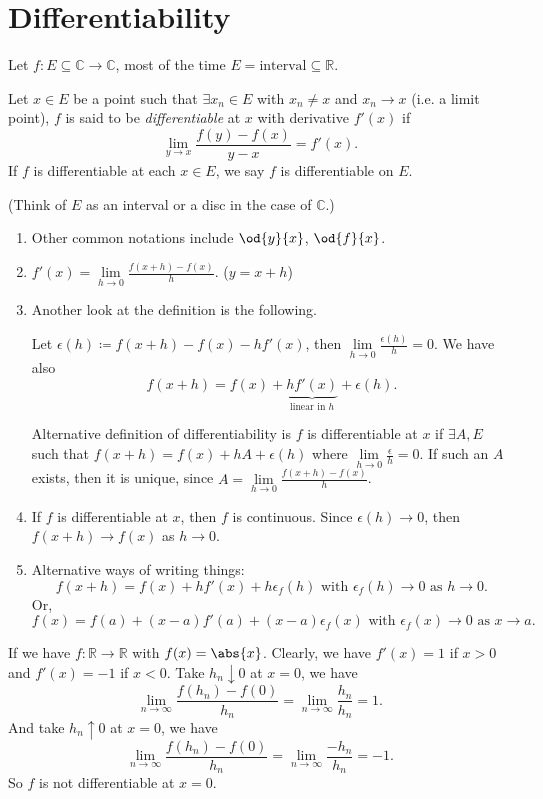 \section{Differentiability}
Let \(f: E \subseteq \mathbb{C} \to \mathbb{C}\), most of the time \(E = \text{interval} \subseteq \mathbb{R}\).
\begin{definition}{}{}
    Let \(x \in E\) be a point such that \(\exists x_n \in E\) with \(x_n \neq x\) and \(x_n \to x\) (i.e. a limit point), \(f\) is said to be \textit{differentiable}  at \(x\) with derivative \(f'(x)\) if
    \[
        \lim\limits_{y \to x} \frac{f(y) - f(x)}{y - x} = f'(x).
    \]
    If \(f\) is differentiable at each \(x \in E\), we say \(f\) is differentiable on \(E\).

    (Think of \(E\) as an interval or a disc in the case of \(\mathbb{C}\).)
\end{definition}
\begin{remark}
    \leavevmode
    \begin{enumerate}
        \item Other common notations include \(\od{y}{x}\), \(\od{f}{x}\).
        \item \(f'(x) = \lim\limits_{h \to 0} \frac{f(x+h)-f(x)}{h}\). (\(y=x+h\))
        \item Another look at the definition is the following.
        
        Let \(\epsilon(h) \coloneqq f(x + h) - f(x) - hf'(x)\), then \(\lim\limits_{h \to 0} \frac{\epsilon(h)}{h}=0\). We have also
        \[
            f(x+h) = f(x) + \underbrace{hf'(x)}_{\text{linear in }h} + \epsilon(h).
        \]

        Alternative definition of differentiability is \(f\) is differentiable at \(x\) if \(\exists A, E\) such that \(f(x + h) = f(x) + hA + \epsilon(h)\) where \(\lim\limits_{h \to 0} \frac{\epsilon}{h}=0\). If such an \(A\) exists, then it is unique, since \(A = \lim\limits_{h \to 0} \frac{f(x+h) - f(x)}{h}\).
        \item If \(f\) is differentiable at \(x\), then \(f\) is continuous. Since \(\epsilon(h) \to 0\), then \(f(x + h) \to f(x)\) as \(h \to 0\).
        \item Alternative ways of writing things:
        \[
            f(x + h) = f(x) + hf'(x) + h\epsilon_f(h) \text{ with } \epsilon_f(h) \to 0 \text{ as } h\to 0.
        \]
        Or,
        \[
            f(x) = f(a) + (x-a)f'(a) + (x-a)\epsilon_f(x) \text{ with } \epsilon_f(x) \to 0 \text{ as } x\to a.
        \]
    \end{enumerate}
\end{remark}
\begin{example}
    If we have \(f: \mathbb{R}\to \mathbb{R}\) with \(f(x) = \abs{x} \). Clearly, we have
    \(f'(x) = 1\) if \(x > 0\) and \(f'(x) = -1\) if \(x < 0\). Take \(h_n \downarrow 0\) at \(x = 0\), we have
    \[
        \lim\limits_{n \to \infty} \frac{f(h_n) - f(0)}{h_n} = \lim\limits_{n \to \infty} \frac{h_n}{h_n} = 1.
    \]
    And take \(h_n \uparrow 0\) at \(x = 0\), we have
    \[
        \lim\limits_{n \to \infty} \frac{f(h_n) - f(0)}{h_n} = \lim\limits_{n \to \infty} \frac{-h_n}{h_n} = -1.
    \]
    So \(f\) is not differentiable at \(x = 0\).
\end{example}
